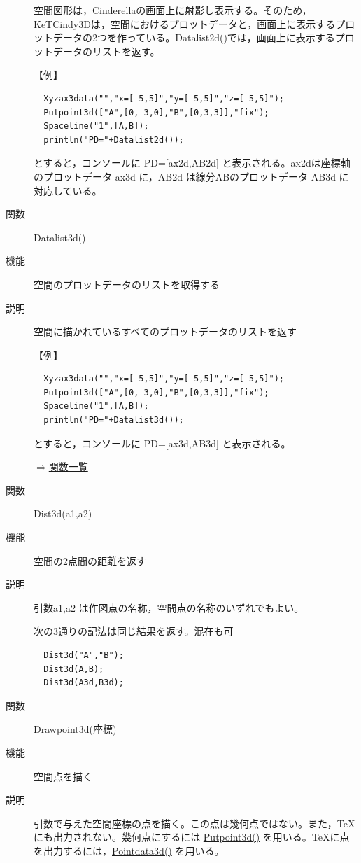 \documentclass[papersize,a4paper,12pt,uplatex]{jsarticle}
\begin{document}
\begin{description}
空間図形は，Cinderellaの画面上に射影し表示する。そのため，KeTCindy3Dは，空間におけるプロットデータと，画面上に表示するプロットデータの2つを作っている。Datalist2d()では，画面上に表示するプロットデータのリストを返す。

\vspace{\baselineskip}
【例】
\begin{verbatim}
  Xyzax3data("","x=[-5,5]","y=[-5,5]","z=[-5,5]");
  Putpoint3d(["A",[0,-3,0],"B",[0,3,3]],"fix");
  Spaceline("1",[A,B]);
  println("PD="+Datalist2d());
\end{verbatim}
とすると，コンソールに  PD=[ax2d,AB2d]   と表示される。ax2dは座標軸のプロットデータ ax3d に，AB2d は線分ABのプロットデータ AB3d に対応している。

\vspace{\baselineskip}
\hypertarget{datalist}{}
\item[関数]  Datalist3d()
\item[機能]  空間のプロットデータのリストを取得する
\item[説明]  空間に描かれているすべてのプロットデータのリストを返す

\vspace{\baselineskip}
【例】
\begin{verbatim}
  Xyzax3data("","x=[-5,5]","y=[-5,5]","z=[-5,5]");
  Putpoint3d(["A",[0,-3,0],"B",[0,3,3]],"fix");
  Spaceline("1",[A,B]);
  println("PD="+Datalist3d());
\end{verbatim}
とすると，コンソールに  PD=[ax3d,AB3d]   と表示される。


\begin{flushright} \hyperlink{functionlist}{$\Rightarrow$関数一覧}\end{flushright}

\hypertarget{dist3d}{}
\item[関数]  Dist3d(a1,a2)
\item[機能]  空間の2点間の距離を返す
\item[説明]  引数a1,a2 は作図点の名称，空間点の名称のいずれでもよい。

次の3通りの記法は同じ結果を返す。混在も可
\begin{verbatim}
  Dist3d("A","B");
  Dist3d(A,B);
  Dist3d(A3d,B3d);
\end{verbatim}
\vspace{\baselineskip}

\hypertarget{drawpoint3d}{}
\item[関数]  Drawpoint3d(座標)
\item[機能]  空間点を描く
\item[説明]  引数で与えた空間座標の点を描く。この点は幾何点ではない。また，TeX にも出力されない。幾何点にするには \hyperlink{putpoint3d}{Putpoint3d()} を用いる。TeXに点を出力するには，\hyperlink{pointdata3d}{Pointdata3d()} を用いる。


\end{description}
\end{document}

